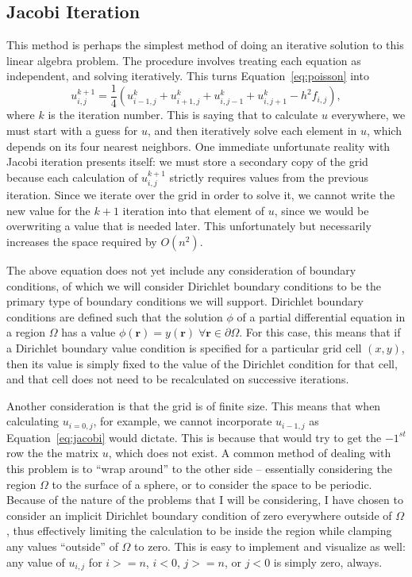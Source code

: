 \subsection{Jacobi Iteration}
This method is perhaps the simplest method of doing an iterative solution to this linear algebra problem. The procedure
involves treating each equation as independent, and solving iteratively. This turns Equation~\ref{eq:poisson} into\cite{poisson-relax}
\begin{equation} \label{eq:jacobi}
u_{i,j}^{k+1} = \frac{1}{4}(u_{i-1,j}^{k} + u_{i+1,j}^{k} + u_{i,j-1}^{k} + u_{i,j+1}^{k} - h^2f_{i,j}),
\end{equation}
where $k$ is the iteration number. This is saying that to calculate $u$ everywhere, we must start with a guess for $u$,
and then iteratively solve each element in $u$, which depends on its four nearest neighbors. One immediate unfortunate
reality with Jacobi iteration presents itself: we must store a secondary copy of the grid because each calculation
of $u_{i,j}^{k+1}$ strictly requires values from the previous iteration. Since we iterate over the grid in order to solve
it, we cannot write the new value for the $k+1$ iteration into that element of $u$, since we would be overwriting a value
that is needed later. This unfortunately but necessarily increases the space required by $O(n^2)$.

The above equation does not yet include any consideration of boundary conditions, of which we will consider Dirichlet boundary
conditions to be the primary type of boundary conditions we will support.
Dirichlet boundary conditions are defined such that the solution $\phi$ of a partial
differential equation in a region $\Omega$ has a value $\phi(\mathbf{r}) = y(\mathbf{r}) \; \forall \mathbf{r} \in \partial \Omega$.
For this case, this means that if a Dirichlet boundary value condition is specified for a particular grid cell $(x,y)$,
then its value is simply fixed to the value of the Dirichlet condition for that cell, and that cell does not need to be recalculated on
successive iterations.

Another consideration is that the grid is of finite size. This means that when calculating $u_{i=0,j}$, for example, we cannot
incorporate $u_{i-1,j}$ as Equation~\ref{eq:jacobi} would dictate. This is because that would try to get the $-1^{st}$ row the
the matrix $u$, which does not exist. A common method of dealing with this problem is to ``wrap around'' to the other side --
essentially considering the region $\Omega$ to the surface of a sphere, or to consider the space to be periodic. Because of
the nature of the problems that I will be considering, I have chosen to consider an implicit Dirichlet boundary condition
of zero everywhere outside of $\Omega$, thus effectively limiting the calculation to be inside the region while clamping any
values ``outside'' of $\Omega$ to zero. This is easy to implement and visualize as well: any value of $u_{i,j}$ for $i >= n$,
$i < 0$, $j >= n$, or $j < 0$ is simply zero, always.

